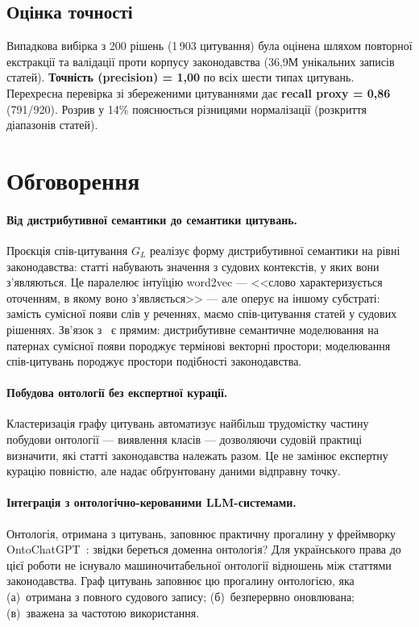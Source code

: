 \documentclass[11pt]{article}
\begin{document}
\subsection{Оцінка точності}

Випадкова вибірка з 200 рішень (1\,903 цитування) була оцінена шляхом повторної екстракції та валідації проти корпусу законодавства (36,9М унікальних записів статей).
\textbf{Точність (precision) = 1{,}00} по всіх шести типах цитувань.
Перехресна перевірка зі збереженими цитуваннями дає \textbf{recall proxy = 0{,}86} (791/920).
Розрив у 14\% пояснюється різницями нормалізації (розкриття діапазонів статей).

\section{Обговорення}
\label{sec:discussion}

\paragraph{Від дистрибутивної семантики до семантики цитувань.}
Проєкція спів-цитування $G_L$ реалізує форму дистрибутивної семантики на рівні законодавства: статті набувають значення з судових контекстів, у яких вони з'являються.
Це паралелює інтуїцію word2vec --- <<слово характеризується оточенням, в якому воно з'являється>> --- але оперує на іншому субстраті: замість сумісної появи слів у реченнях, маємо спів-цитування статей у судових рішеннях.
Зв'язок з~\citet{palagin2020distributional} є прямим: дистрибутивне семантичне моделювання на патернах сумісної появи породжує термінові векторні простори; моделювання спів-цитувань породжує простори подібності законодавства.

\paragraph{Побудова онтології без експертної курації.}
Кластеризація графу цитувань автоматизує найбільш трудомістку частину побудови онтології --- виявлення класів --- дозволяючи судовій практиці визначити, які статті законодавства належать разом.
Це не замінює експертну курацію повністю, але надає обґрунтовану даними відправну точку.

\paragraph{Інтеграція з онтологічно-керованими LLM-системами.}
Онтологія, отримана з цитувань, заповнює практичну прогалину у фреймворку OntoChatGPT~\citep{palagin2023ontochatgpt}: звідки береться доменна онтологія?
Для українського права до цієї роботи не існувало машиночитабельної онтології відношень між статтями законодавства.
Граф цитувань заповнює цю прогалину онтологією, яка (а)~отримана з повного судового запису; (б)~безперервно оновлювана; (в)~зважена за частотою використання.
\end{document}
